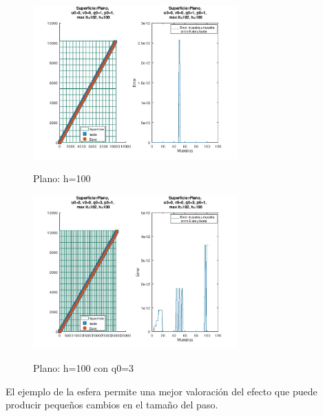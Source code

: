 \documentclass{endm}
\begin{document}
\begin{figure}[H]
\caption{Plano: h=100 }
\centering
\includegraphics[width=0.7\textwidth]{planoh100.jpg}
\label{fig:planoh100}
\end{figure}

\begin{figure}[H]
\caption{Plano: h=100 con q0=3}
\centering
\includegraphics[width=0.7\textwidth]{planoh100q03.jpg}
\label{fig:planoh100q03}
\end{figure}


El ejemplo de la esfera permite una mejor valoraci\'on del efecto que puede producir peque\~nos cambios en el tama\~no del paso. 
\end{document}
